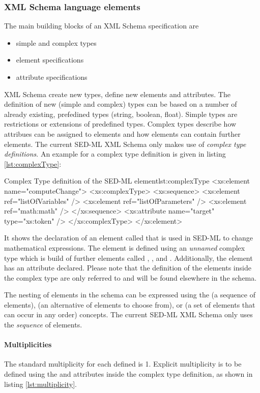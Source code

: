 \subsubsection{XML Schema language elements}
The main building blocks of an XML Schema specification are
\begin{itemize}
\item {simple and complex types}
\item {element specifications}
\item {attribute specifications}
\end{itemize}
XML Schema  create new types,  define new elements and attributes.
The definition of new (simple and complex) types can be based on a number of already existing, prefedined types (string, boolean, float). Simple types are restrictions or extensions of predefined types. Complex types describe how attribues can be assigned to elements and how elements can contain further elements. The current SED-ML XML Schema only makes use of \emph{complex type definitions}.
An example for a complex type definition is given in listing \ref{lst:complexType}:
%
\begin{myXmlLst}{Complex Type definition of the SED-ML  element}{lst:complexType}
<xs:element name="computeChange">
 <xs:complexType>
  <xs:sequence>
   <xs:element ref="listOfVariables" />
   <xs:element ref="listOfParameters" />
   <xs:element ref="math:math" />
  </xs:sequence>
  <xs:attribute name="target" type="xs:token" />
 </xs:complexType>
</xs:element>
\end{myXmlLst}
%
It shows the declaration of an element called  that is used in SED-ML to change mathematical expressions. The element is defined using an \emph{unnamed} complex type which is build of further elements called , , and . 
Additionally, the element  has an attribute  declared. Please note that the definition of the elements inside the complex type are only referred to and will be found elsewhere in the schema.

The nesting of elements in the schema can be expressed using the  (a sequence of elements),  (an alternative of elements to choose from), or  (a set of elements that can occur in any order) concepts. The current SED-ML XML Schema only uses the \emph{sequence} of elements. 

\paragraph{Multiplicities}
The standard multiplicity for each defined  is 1. Explicit multiplicity is to be defined using the  and  attributes inside the complex type definition, as shown in listing \ref{lst:multiplicity}.


